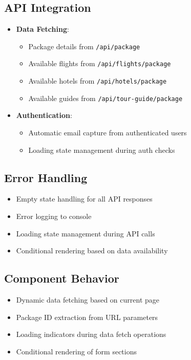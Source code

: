\subsection{API Integration}
\begin{itemize}
    \item \textbf{Data Fetching}:
    \begin{itemize}
        \item Package details from \texttt{/api/package}
        \item Available flights from \texttt{/api/flights/package}
        \item Available hotels from \texttt{/api/hotels/package}
        \item Available guides from \texttt{/api/tour-guide/package}
    \end{itemize}
    
    \item \textbf{Authentication}:
    \begin{itemize}
        \item Automatic email capture from authenticated users
        \item Loading state management during auth checks
    \end{itemize}
\end{itemize}

\subsection{Error Handling}
\begin{itemize}
    \item Empty state handling for all API responses
    \item Error logging to console
    \item Loading state management during API calls
    \item Conditional rendering based on data availability
\end{itemize}

\subsection{Component Behavior}
\begin{itemize}
    \item Dynamic data fetching based on current page
    \item Package ID extraction from URL parameters
    \item Loading indicators during data fetch operations
    \item Conditional rendering of form sections
\end{itemize}